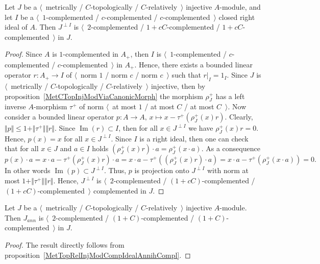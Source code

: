 \begin{proposition}\label{MetTopRelInjModCompIdealAnnihCompl} Let $J$ 
be a $\langle$~metrically / $C$-topologically / $C$-relatively~$\rangle$ 
injective $A$-module, and let $I$ 
be a $\langle$~$1$-complemented / $c$-complemented / $c$-complemented~$\rangle$
closed right ideal of $A$. Then $J^{\perp I}$ 
is $\langle$~$2$-complemented / $1+cC$-complemented / 
$1+cC$-complemented~$\rangle$ in $J$.
\end{proposition}
\begin{proof} Since $A$ is $1$-complemented in $A_+$, then $I$ 
is $\langle$~$1$-complemented / $c$-complemented / $c$-complemented~$\rangle$
in $A_+$. Hence, there exists a bounded linear operator $r:A_+\to I$ of 
$\langle$~norm $1$ / norm $c$ / norm $c$~$\rangle$ such that $r|_I=1_I$. 
Since $J$ is $\langle$~metrically / $C$-topologically / $C$-relatively~$\rangle$ 
injective, then by proposition~\ref{MetCTopInjModViaCanonicMorph} the 
morphism $\rho_J^+$ has a left inverse $A$-morphism $\tau^+$ of norm 
$\langle$~at most $1$ / at most $C$ / at most $C$~$\rangle$. Now consider 
a bounded linear operator $p:A\to A,\, x\mapsto x-\tau^+(\rho_J^+(x)r)$. Clearly,
$\Vert p\Vert\leq 1+\Vert \tau^+\Vert\Vert r\Vert$. 
Since $\operatorname{Im}(r)\subset I$, then for all $x\in J^{\perp I}$ we 
have $\rho_J^+(x)r=0$. Hence, $p(x)=x$ for all $x\in J^{\perp I}$. Since $I$ is 
a right ideal, then one can check that for all $x\in J$ and $a\in I$ holds 
$(\rho_J^+(x)r)\cdot a=\rho_J^+(x\cdot a)$. As a consequence 
$$
p(x)\cdot a
=x\cdot a-\tau^+(\rho_J^+(x)r)\cdot a
=x\cdot a-\tau^+((\rho_J^+(x)r)\cdot a)
=x\cdot a-\tau^+(\rho_J^+(x\cdot a))
=0.
$$
In other words $\operatorname{Im}(p)\subset J^{\perp I}$. Thus, $p$ is 
projection onto $J^{\perp I}$ with norm at 
most $1+\Vert \tau^+\Vert\Vert r\Vert$. Hence, $J^{\perp I}$ 
is $\langle$~$2$-complemented / $(1+cC)$-complemented / 
$(1+cC)$-complemented~$\rangle$ complemented in $J$.
\end{proof}


\begin{corollary}\label{MetTopRelInjModAnnihCompl} Let $J$ 
be a $\langle$~metrically / $C$-topologically / $C$-relatively~$\rangle$ 
injective $A$-module. Then $J_{ann}$ 
is $\langle$~$2$-complemented / $(1+C)$-complemented / 
$(1+C)$-complemented~$\rangle$ in $J$.
\end{corollary}
\begin{proof} The result directly follows from 
proposition~\ref{MetTopRelInjModCompIdealAnnihCompl}.
\end{proof}

